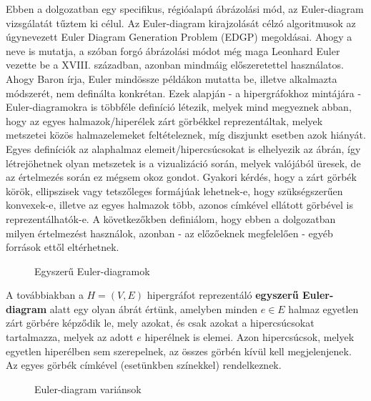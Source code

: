 Ebben a dolgozatban egy specifikus, régióalapú ábrázolási mód, az Euler-diagram vizsgálatát tűztem ki célul. Az Euler-diagram kirajzolását célzó algoritmusok az úgynevezett Euler Diagram Generation Problem (EDGP) megoldásai. Ahogy a neve is mutatja, a szóban forgó ábrázolási módot még maga Leonhard Euler vezette be a XVIII. században, azonban mindmáig előszeretettel használatos. Ahogy Baron írja\cite{euler_early}, Euler mindössze példákon mutatta be, illetve alkalmazta módszerét, nem definálta konkrétan. Ezek alapján - a hipergráfokhoz mintájára - Euler-diagramokra is többféle definíció létezik, melyek mind megyeznek abban, hogy az egyes halmazok/hiperélek zárt görbékkel reprezentáltak, melyek metszetei közös halmazelemeket feltételeznek, míg diszjunkt esetben azok hiányát. Egyes definíciók az alaphalmaz elemeit/hipercsúcsokat is elhelyezik az ábrán, így létrejöhetnek olyan metszetek is a vizualizáció során, melyek valójából üresek, de az értelmezés során ez mégsem okoz gondot. Gyakori kérdés, hogy a zárt görbék körök, ellipszisek vagy tetszőleges formájúak lehetnek-e, hogy szükségszerűen konvexek-e, illetve az egyes halmazok több, azonos címkével ellátott görbével is reprezentálhatók-e. A következőkben definiálom, hogy ebben a dolgozatban milyen értelmezést használok, azonban - az előzőeknek megfelelően - egyéb források ettől eltérhetnek.

\begin{figure}[H]
	\centering
	\hspace{5pt}
	\caption{Egyszerű Euler-diagramok}
	\label{fig:euler_simple}
\end{figure}

\begin{definition}
A továbbiakban a $H=(V,E)$ hipergráfot reprezentáló \textbf{egyszerű Euler-diagram} alatt egy olyan ábrát értünk, amelyben minden $e \in E$ halmaz egyetlen zárt görbére képződik le, mely azokat, és csak azokat a hipercsúcsokat tartalmazza, melyek az adott $e$ hiperélnek is elemei. Azon hipercsúcsok, melyek egyetlen hiperélben sem szerepelnek, az összes görbén kívül kell megjelenjenek. Az egyes görbék címkével (esetünkben színekkel) rendelkeznek.
\end{definition}

\begin{figure}[H]
	\centering
	\hspace{5pt}
	\caption{Euler-diagram variánsok}
	\label{fig:euler_general}
\end{figure}

